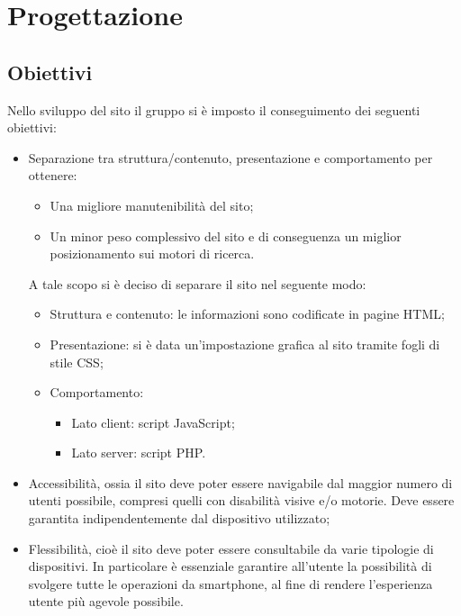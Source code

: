 \section{Progettazione}

\subsection{Obiettivi}
Nello sviluppo del sito il gruppo si è imposto il conseguimento dei seguenti obiettivi:
\begin{itemize}
	\item Separazione tra struttura/contenuto, presentazione e comportamento per ottenere:
	\begin{itemize}
		\item Una migliore manutenibilità del sito;
		\item Un minor peso complessivo del sito e di conseguenza un miglior posizionamento sui motori
		di ricerca.
	\end{itemize}
	A tale scopo si è deciso di separare il sito nel seguente modo:
	\begin{itemize}
		\item Struttura e contenuto: le informazioni sono codificate in pagine HTML;
		\item Presentazione: si è data un'impostazione grafica al sito tramite fogli di stile CSS;
		\item Comportamento:
		\begin{itemize}
			\item Lato client: script JavaScript;
			\item Lato server: script PHP.
		\end{itemize}
	\end{itemize}
	\item Accessibilità, ossia il sito deve poter essere navigabile dal maggior numero di utenti
	possibile, compresi quelli con disabilità visive e/o motorie. Deve essere garantita indipendentemente
	dal dispositivo utilizzato;
	\item Flessibilità, cioè il sito deve poter essere consultabile da varie tipologie di dispositivi.
	In particolare è essenziale garantire all'utente la possibilità di svolgere tutte le operazioni da
	smartphone, al fine di rendere l'esperienza utente più agevole possibile.
\end{itemize}

